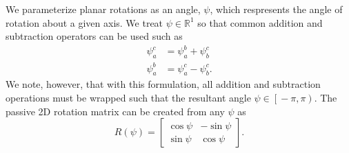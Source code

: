We parameterize planar rotations as an angle, $\psi$, which respresents
the angle of rotation about a given axis.
We treat $\psi \in \mathbb{R}^1$ so that common addition and subtraction
operators can be used such as
\begin{align}
  \psi_a^c &= \psi_a^b + \psi_b^c \\
  \psi_a^b &= \psi_a^c - \psi_b^c.
\end{align}
We note, however, that with this formulation, all addition and subtraction
operations must be wrapped such
that the resultant angle $\psi \in \left[ \right. -\pi, \pi \left. \right)$. The
passive 2D
rotation matrix can be created from any $\psi$ as
\begin{equation}
  R \left( \psi \right) = \begin{bmatrix} \cos \psi & -\sin \psi \\ \sin \psi &
  \cos \psi \end{bmatrix}.
\end{equation}


